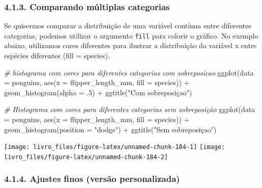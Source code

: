 \documentclass[
]{book}
\newenvironment{Shaded}{\begin{snugshade}}{\end{snugshade}}
\newcommand{\AttributeTok}[1]{\textcolor[rgb]{0.61,0.61,0.61}{#1}}
\newcommand{\CommentTok}[1]{\textcolor[rgb]{0.37,0.37,0.37}{\textit{#1}}}
\newcommand{\DecValTok}[1]{\textcolor[rgb]{0.06,0.06,0.06}{#1}}
\newcommand{\FunctionTok}[1]{\textcolor[rgb]{0,0,0}{#1}}
\newcommand{\NormalTok}[1]{#1}
\newcommand{\SpecialCharTok}[1]{\textcolor[rgb]{0,0,0}{#1}}
\newcommand{\StringTok}[1]{\textcolor[rgb]{0.5,0.5,0.5}{#1}}
\begin{document}
\hypertarget{comparando-muxfaltiplas-categorias}{%
\subsubsection{4.1.3. Comparando múltiplas categorias}\label{comparando-muxfaltiplas-categorias}}

Se quisermos comparar a distribuição de uma variável contínua entre diferentes categorias, podemos utilizar o argumento \texttt{fill} para colorir o gráfico. No exemplo abaixo, utilizamos cores diferentes para ilustrar a distribuição da variável x entre espécies diferentes (fill = species).

\begin{Shaded}
\begin{Highlighting}[]
\CommentTok{\# histograma com cores para diferentes categorias com sobreposicao}
\FunctionTok{ggplot}\NormalTok{(}\AttributeTok{data =}\NormalTok{ penguins, }
       \FunctionTok{aes}\NormalTok{(}\AttributeTok{x =}\NormalTok{ flipper\_length\_mm, }\AttributeTok{fill =}\NormalTok{ species)) }\SpecialCharTok{+}
  \FunctionTok{geom\_histogram}\NormalTok{(}\AttributeTok{alpha =}\NormalTok{ .}\DecValTok{5}\NormalTok{) }\SpecialCharTok{+}
  \FunctionTok{ggtitle}\NormalTok{(}\StringTok{"Com sobreposiçao"}\NormalTok{)}

\CommentTok{\# Histograma com cores para diferentes categorias sem sobreposição}
\FunctionTok{ggplot}\NormalTok{(}\AttributeTok{data =}\NormalTok{ penguins, }\FunctionTok{aes}\NormalTok{(}\AttributeTok{x =}\NormalTok{ flipper\_length\_mm, }\AttributeTok{fill =}\NormalTok{ species)) }\SpecialCharTok{+}
  \FunctionTok{geom\_histogram}\NormalTok{(}\AttributeTok{position =} \StringTok{"dodge"}\NormalTok{) }\SpecialCharTok{+}
  \FunctionTok{ggtitle}\NormalTok{(}\StringTok{"Sem sobreposiçao"}\NormalTok{)}
\end{Highlighting}
\end{Shaded}

\begin{center}\texttt{[image: livro\_files/figure-latex/unnamed-chunk-184-1]} \texttt{[image: livro\_files/figure-latex/unnamed-chunk-184-2]} \end{center}

\hypertarget{ajustes-finos-versuxe3o-personalizada}{%
\subsubsection{4.1.4. Ajustes finos (versão personalizada)}\label{ajustes-finos-versuxe3o-personalizada}}
\end{document}
